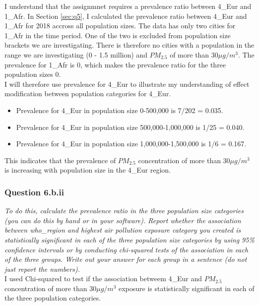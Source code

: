 \noindent I understand that the assignmnet requires a prevalence ratio between 4\_Eur and 1\_Afr. In Section \ref{sec:q5}, I calculated the prevalence ratio between 4\_Eur and 1\_Afr for 2018 accross all population sizes. The data has only two cities for 1\_Afr in the time period. One of the two is excluded from population size brackets we are investigating. There is therefore  no cities with a population in the range we are investigating (0 - 1.5 million) and $PM_{2.5}$ of more than $30 \mu g/m^3 $. The prevalence for 1\_Afr is 0, which makes the prevalence ratio for the three population sizes 0. \\


\noindent I will therefore use prevalence for 4\_Eur to illustrate my understanding of effect modification between population categories for 4\_Eur.

\begin{itemize}
    \item Prevalence for 4\_Eur in population size 0-500,000 is 7/202 = 0.035.
    \item Prevalence for 4\_Eur in population size 500,000-1,000,000 is 1/25 = 0.040.
    \item Prevalence for 4\_Eur in population size 1,000,000-1,500,000 is 1/6 = 0.167.
\end{itemize}

\noindent This indicates that the prevalence of $PM_{2.5}$ concentration of more than $30 \mu g/m^3 $ is increasing with population size in the 4\_Eur region. 

\subsubsection{Question 6.b.ii}
\textit{To do this, calculate the prevalence ratio in the three population size categories (you can do this by hand or in your software).
Report whether the association between who\_region and highest air
pollution exposure category you created is statistically significant in each
of the three population size categories by using 95\% confidence intervals
or by conducting chi-squared tests of the association in each of the three
groups. Write out your answer for each group in a sentence (do not just
report the numbers).}\\

\noindent I used Chi-squared to test if the association betweem 4\_Eur and $PM_{2.5}$ concentration of more than $30 \mu g/m^3 $ exposure is statistically significant in each of the three population categories. \\


